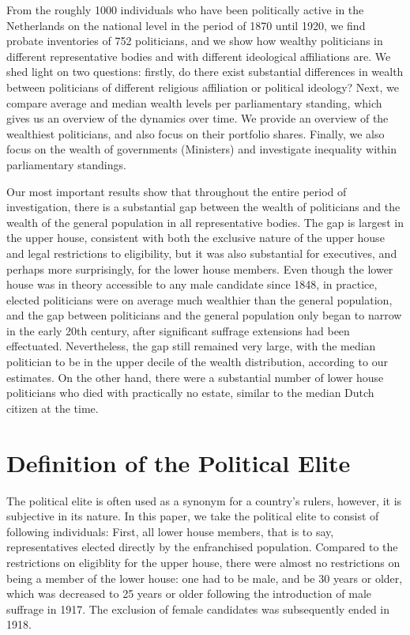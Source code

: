     From the roughly 1000 individuals who have been politically active in the Netherlands on the national level in the period of 1870 until 1920, we find probate inventories of 752 politicians, and we show how wealthy politicians in different representative bodies and with different ideological affiliations are. We shed light on two questions: firstly, do there exist substantial differences in wealth between politicians of different religious affiliation or political ideology? Next, we compare average and median wealth levels per parliamentary standing, which gives us an overview of the dynamics over time. We provide an overview of the wealthiest politicians, and also focus on their portfolio shares. Finally, we also focus on the wealth of governments (Ministers) and investigate inequality within parliamentary standings. 

    Our most important results show that throughout the entire period of investigation, there is a substantial gap between the wealth of politicians and the wealth of the general population in all representative bodies. The gap is largest in the upper house, consistent with both the exclusive nature of the upper house and legal restrictions to eligibility, but it was also substantial for executives, and perhaps more surprisingly, for the lower house members. Even though the lower house was in theory accessible to any male candidate since 1848, in practice, elected politicians were on average much wealthier than the general population, and the gap between politicians and the general population only began to narrow in the early 20th century, after significant suffrage extensions had been effectuated. Nevertheless, the gap still remained very large, with the median politician to be in the upper decile of the wealth distribution, according to our estimates. On the other hand, there were a substantial number of lower house politicians who died with practically no estate, similar to the median Dutch citizen at the time.\autocite{de2020exploring}

\section{Definition of the Political Elite}
    The political elite is often used as a synonym for a country's rulers, however, it is subjective in its nature. In this paper, we take the political elite to consist of following individuals: First, all lower house members, that is to say, representatives elected directly by the enfranchised population. Compared to the restrictions on eligiblity for the upper house, there were almost no restrictions on being a member of the lower house: one had to be male, and be 30 years or older, which was decreased to 25 years or older following the introduction of male suffrage in 1917. The exclusion of female candidates was subsequently ended in 1918. \autocite{van2018tussen} 

